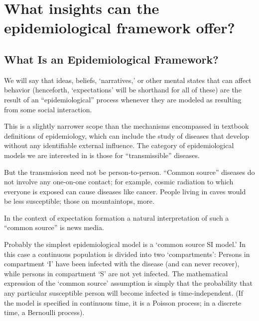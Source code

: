 \section{What insights can the epidemiological framework
  offer?}\label{what-insights-can-the-epidemiological-framework-offer}

\subsection{What Is an Epidemiological Framework?}
\label{subsec:epi_framework}

We will say that ideas, beliefs, `narratives,' or other mental states that can affect behavior
(henceforth, `expectations' will be shorthand for all of these) are the result of an ``epidemiological'' process whenever they are modeled as resulting from some social interaction.

This is a slightly narrower scope than the mechanisms encompassed in textbook
definitions of epidemiology, which can include the study of diseases that develop without any identifiable external influence.  The category of epidemiological models we are interested in is those for ``transmissible'' diseases.

But the transmission need not be person-to-person.   ``Common source''  diseases do not involve any one-on-one contact; for example, cosmic radiation to which everyone is exposed can cause diseases like cancer.  People living in caves would be less susceptible; those on mountaintops, more.

In the context of expectation formation a natural interpretation of such a ``common source'' is news media.

\begin{comment}
Having clarified this boundary, epidemiological models that are relevant for us vary in a few fundamental ways:
\begin{quote}\normalfont
\begin{enumerate}
\item the states that agents could possibly experience
\item the process by which an agent's state can change via social communication
\item the channels of social communication
\item heterogeneity or evolution over time that affects any of these
\end{enumerate}
\end{quote}
\end{comment}
Probably the simplest epidemiological model is a `common source SI model.'  In this case a continuous population is divided into two `compartments': Persons in compartment `I' have been infected with the disease (and can never recover), while persons in compartment `S' are not yet infected.  The mathematical expression of the `common source' assumption is simply that the probability that any particular susceptible person will become infected is time-independent.  (If the model is specified in continuous time, it is a Poisson process; in a discrete time, a Bernoulli process).

